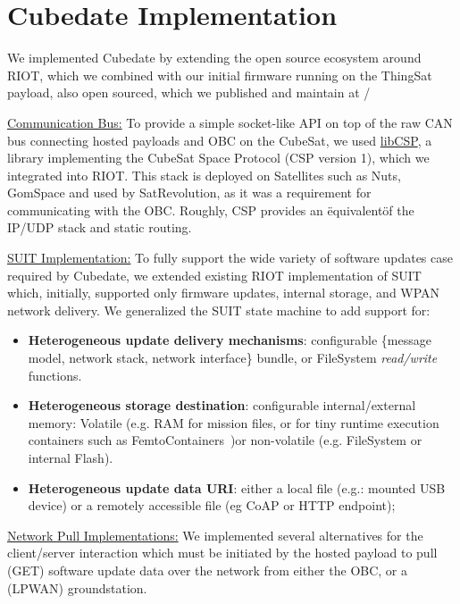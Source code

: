 \section{Cubedate Implementation}
\label{sec:implementation}

We implemented Cubedate by extending the open source ecosystem around RIOT, which we combined with
our initial firmware running on the ThingSat payload, also open sourced, which we published and
maintain at \cite*{git:cubedate-repo}/

\underline{Communication Bus:}
To provide a simple socket-like API on top of the raw CAN bus connecting hosted
payloads and OBC on the CubeSat, we used \href{https://github.com/libcsp/libcsp}{libCSP},
a library implementing the CubeSat Space Protocol (CSP version 1), which we integrated into RIOT.
This stack is deployed on Satellites such as Nuts\cite{birkeland2014nutsoverview}, GomSpace
and used by SatRevolution, as it was a requirement for communicating with the OBC.
Roughly, CSP provides an \"equivalent\" of the IP/UDP stack and static routing.

\underline{SUIT Implementation:}
To fully support the wide variety of software updates case required by Cubedate, we
extended existing RIOT implementation of SUIT~\cite{zandberg2019secure} which,
initially, supported only firmware updates, internal storage, and WPAN network delivery.
We generalized the SUIT state machine to add support for:

\begin{itemize}
    \item \textbf{Heterogeneous update delivery mechanisms}: configurable \{message model,
    network stack, network interface\} bundle, or FileSystem \textit{read/write} functions.
    \item \textbf{Heterogeneous storage destination}: configurable internal/external memory:
    Volatile (e.g. RAM for mission files, or for tiny runtime execution containers such as
    FemtoContainers~\cite{zandberg2021femto})or non-volatile (e.g. FileSystem or internal Flash).
    \item \textbf{Heterogeneous update data URI}: either a local file (e.g.: mounted USB device)
    or a remotely accessible file (eg CoAP or HTTP endpoint);
\end{itemize}

\underline{Network Pull Implementations:}
We implemented several alternatives for the client/server interaction which
must be initiated by the hosted payload to pull (GET) software update data over the
network from either the OBC, or a (LPWAN) groundstation.

